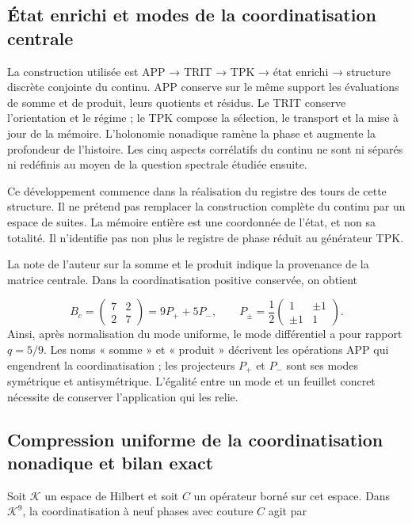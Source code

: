\subsection{État enrichi et modes de la coordinatisation centrale}
\label{tm-add-c1}
La construction utilisée est APP → TRIT → TPK → état enrichi → structure discrète conjointe du continu. APP conserve sur le même support les évaluations de somme et de produit, leurs quotients et résidus. Le TRIT conserve l'orientation et le régime ; le TPK compose la sélection, le transport et la mise à jour de la mémoire. L'holonomie nonadique ramène la phase et augmente la profondeur de l'histoire. Les cinq aspects corrélatifs du continu ne sont ni séparés ni redéfinis au moyen de la question spectrale étudiée ensuite.

Ce développement commence dans la réalisation du registre des tours de cette structure. Il ne prétend pas remplacer la construction complète du continu par un espace de suites. La mémoire entière est une coordonnée de l'état, et non sa totalité. Il n'identifie pas non plus le registre de phase réduit au générateur TPK.

La note de l'auteur sur la somme et le produit indique la provenance de la matrice centrale. Dans la coordinatisation positive conservée, on obtient

\[
B_c=\begin{pmatrix}7&2\\2&7\end{pmatrix}
=9P_++5P_-,\qquad
P_\pm=\frac12\begin{pmatrix}1&\pm1\\\pm1&1\end{pmatrix}.
\]
Ainsi, après normalisation du mode uniforme, le mode différentiel a pour rapport \(q=5/9\). Les noms « somme » et « produit » décrivent les opérations APP qui engendrent la coordinatisation ; les projecteurs \(P_+\) et \(P_-\) sont ses modes symétrique et antisymétrique. L'égalité entre un mode et un feuillet concret nécessite de conserver l'application qui les relie.


\subsection{Compression uniforme de la coordinatisation nonadique et bilan exact}
\label{tm-add-c2}
Soit \(\mathcal K\) un espace de Hilbert et soit \(C\) un opérateur borné sur cet espace. Dans \(\mathcal K^9\), la coordinatisation à neuf phases avec couture \(C\) agit par

